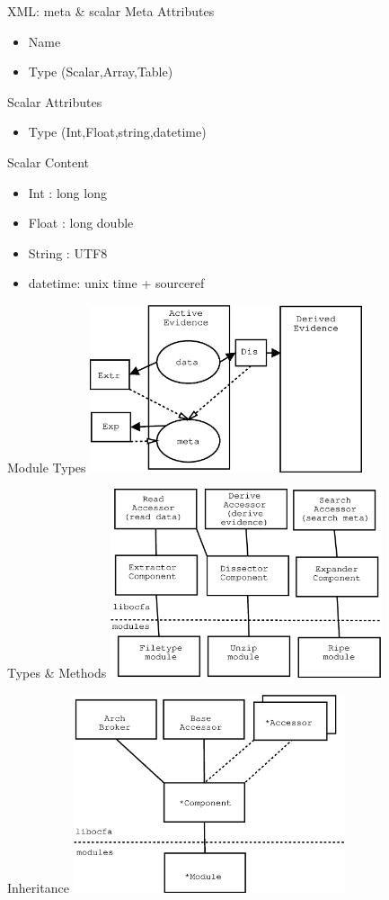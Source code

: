 \documentclass[pdf,contemporain,slideColor,colorBG,accumulate,nototal,capsules]{prosper}
\begin{document}
\begin{slide}{XML: meta \& scalar}
Meta Attributes
\begin{itemize}
\item Name
\item Type (Scalar,Array,Table)
\end{itemize}
Scalar Attributes
\begin{itemize}
\item Type (Int,Float,string,datetime)
\end{itemize}
Scalar Content
\begin{itemize}
\item Int : long long
\item Float : long double
\item String : UTF8
\item datetime: unix time + sourceref
\end{itemize}
\end{slide}
\begin{slide}{Module Types}
\includegraphics[width=8cm]{dia3.eps}
\end{slide}
\begin{slide}{Types \& Methods}
\includegraphics[width=8cm]{dia4.eps}
\end{slide}
\begin{slide}{Inheritance}
\includegraphics[width=8cm]{dia5.eps}
\end{slide}
\end{document}
